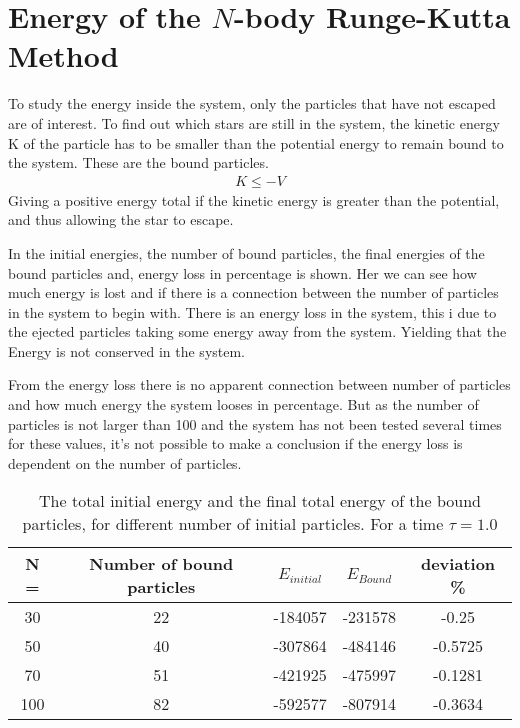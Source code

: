 \section{Energy of the $N$-body Runge-Kutta Method}
\label{sec:EnergyRK4}


To study the energy inside the system, only the particles that have not escaped are of interest. To find out which stars are still in the system, the kinetic energy K of the particle has to be smaller than the potential energy to remain bound to the system. These are the bound particles.   
\begin{align}
  K \leqslant -V
\end{align}
Giving a positive energy total if the kinetic energy is greater than the potential, and thus allowing the star to escape.

In  the initial energies, the number of bound particles, the final energies of the bound particles and, energy loss in percentage is shown. Her we can see how much energy is lost and if there is a connection between the number of particles in the system to begin with. There is an energy loss in the system, this i due to the ejected particles taking some energy away from the system. Yielding that the Energy is not conserved in the system. 

From the energy loss there is no apparent connection between number of particles and how much energy the system looses in percentage. But as the number of particles is not larger than 100 and the system has not been tested several times for these values, it's not possible to make a conclusion if the energy loss is dependent on the number of particles. 



\begin{table}[H]
\centering
\begin{tabular}{|c|c|c|c|c|}
\hline
N = & Number of bound particles& $E_{initial}$ & $E_{Bound}$ & deviation \% \\
\hline
30  &  22 & -184057 & -231578  & -0.25 \\
50  & 40 & -307864 & -484146 & -0.5725 \\
70  & 51 & -421925 & -475997 & -0.1281 \\
100 & 82 & -592577 & -807914 & -0.3634 \\
\hline
\end{tabular}
\caption{The total initial energy and the final total energy of the bound particles, for different number of initial particles. For a time $\tau = 1.0$ }
\label{tab:NpRK4}
\end{table}

